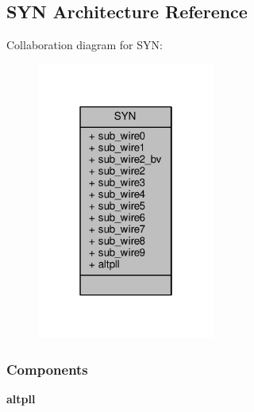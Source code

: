 \subsection{S\+YN Architecture Reference}
\label{classtxpll_1_1SYN}


Collaboration diagram for S\+YN\+:\nopagebreak
\begin{figure}[H]
\begin{center}
\leavevmode
\includegraphics[width=166pt]{de/db0/classtxpll_1_1SYN__coll__graph}
\end{center}
\end{figure}
\subsubsection*{Components}
 \begin{DoxyCompactItemize}
\item 
{\bf altpll}  {\bfseries }  
\end{DoxyCompactItemize}
